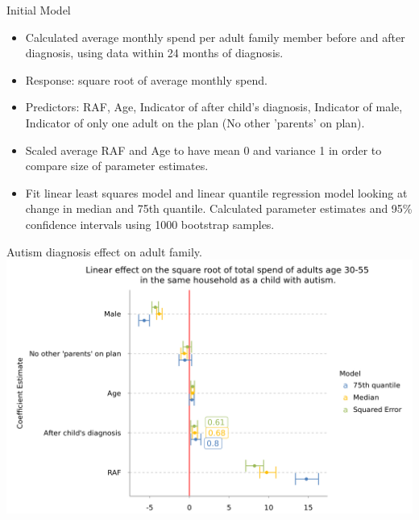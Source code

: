 \documentclass[xcolor=x11names,compress]{beamer}
\renewcommand{\(}{\begin{columns}}
\renewcommand{\)}{\end{columns}}
\newcommand{\<}[1]{\begin{column}{#1}}
\renewcommand{\>}{\end{column}}
\begin{document}
\begin{frame}{Initial Model}
\begin{itemize}
	\item Calculated average monthly spend per adult family member before and after diagnosis, using data within 24 months of diagnosis. 
	\item Response: square root of average monthly spend. 
	\item Predictors: RAF, Age, Indicator of after child's diagnosis, Indicator of male, Indicator of only one adult on the plan (No other 'parents' on plan). 
	\item Scaled average RAF and Age to have mean 0 and variance 1 in order to compare size of parameter estimates. 
	\item Fit linear least squares model and linear quantile regression model looking at change in median and 75th quantile. Calculated parameter estimates and 95\% confidence intervals using 1000 bootstrap samples. 

\end{itemize}
\end{frame}

\begin{frame}{Autism diagnosis effect on adult family. }
  \includegraphics[width=\linewidth]{../figures/parameter_est_ASD.png}
\end{frame}
\end{document}
